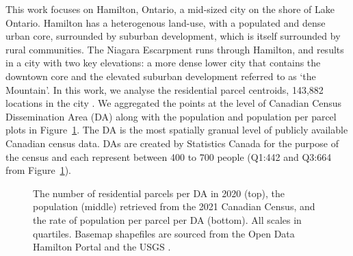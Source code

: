 \documentclass[
  authoryear,
  preprint,
  3p]{elsarticle}
\begin{document}
This work focuses on Hamilton, Ontario, a mid-sized city on the shore of
Lake Ontario. Hamilton has a heterogenous land-use, with a populated and
dense urban core, surrounded by suburban development, which is itself
surrounded by rural communities. The Niagara Escarpment runs through
Hamilton, and results in a city with two key elevations: a more dense
lower city that contains the downtown core and the elevated suburban
development referred to as `the Mountain'. In this work, we analyse the
residential parcel centroids, 143,882 locations in the city
\citep{Teranet_2021}. We aggregated the points at the level of Canadian
Census Dissemination Area (DA) along with the population and population
per parcel plots in Figure~\ref{fig-Fig1}. The DA is the most spatially
granual level of publicly available Canadian census data. DAs are
created by Statistics Canada for the purpose of the census and each
represent between 400 to 700 people (Q1:442 and Q3:664 from
Figure~\ref{fig-Fig1}).

\begin{figure}


\caption{\label{fig-Fig1}The number of residential parcels per DA in
2020 (top), the population (middle) retrieved from the 2021 Canadian
Census, and the rate of population per parcel per DA (bottom). All
scales in quartiles. Basemap shapefiles are sourced from the Open Data
Hamilton Portal \citep{opendatahamiltonCityBoundary2023} and the USGS
\citep{greatlakesUSGS2010}.}

\end{figure}%
\end{document}
